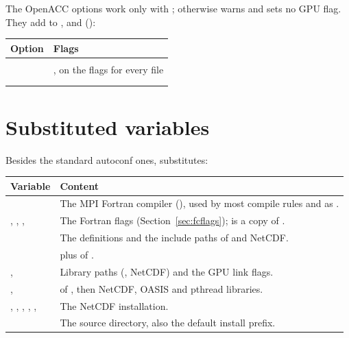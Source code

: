 The OpenACC options work only with ; otherwise
 warns and sets no GPU flag. They add to ,
 and  ():

\begin{longtable}{L{4.5cm} L{9cm}}
  \toprule
  \textbf{Option} & \textbf{Flags} \\
  \midrule
  \endhead
  \bottomrule
  \endfoot
   &  \\
   & , on the  flags
    for every file \\
   &  \\
   &  \\
\end{longtable}

\section{Substituted variables}

Besides the standard autoconf ones,  substitutes:

\begin{longtable}{L{4cm} L{9.5cm}}
  \toprule
  \textbf{Variable} & \textbf{Content} \\
  \midrule
  \endhead
  \bottomrule
  \endfoot
   & The MPI Fortran compiler (), used by most
    compile rules and as . \\
  , , ,  & The
    Fortran flags (Section~\ref{sec:fcflags});  is a copy
    of . \\
   & The  definitions and the include paths of
     and NetCDF. \\
   &  plus  of . \\
  ,  & Library paths (,
    NetCDF) and the GPU link flags. \\
  ,  &  of , then
    NetCDF, OASIS and pthread libraries. \\
  , , , ,
    ,  & The NetCDF installation. \\
   & The source directory, also the default install
    prefix. \\
\end{longtable}

